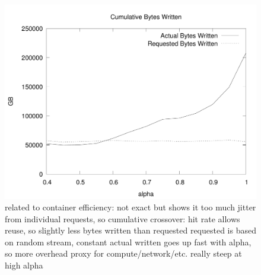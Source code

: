 \documentclass[sigconf]{acmart}
\begin{document}
\begin{figure}
\includegraphics[width=\linewidth]{curated/comparative/container_efficiency.pdf}
related to container efficiency: not exact but shows it
too much jitter from individual requests, so cumulative
crossover: hit rate allows reuse, so slightly less bytes written than requested
requested is based on random stream, constant
actual written goes up fast with alpha, so more overhead
proxy for compute/network/etc.
really steep at high alpha
\fi
\end{figure}
\end{document}
